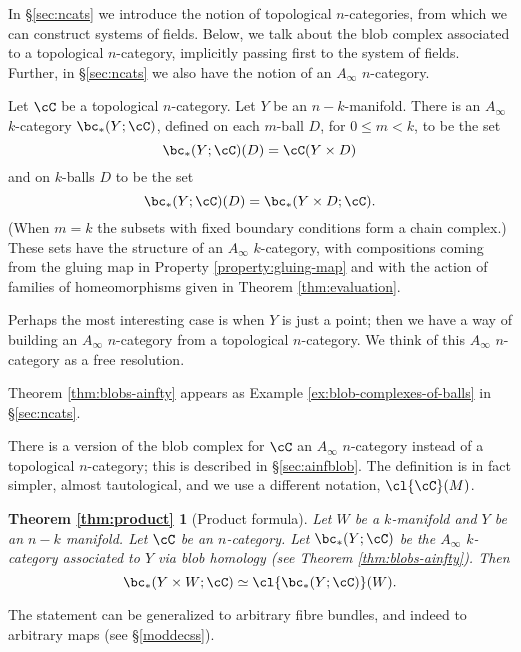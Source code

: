 

In \S \ref{sec:ncats} we introduce the notion of topological $n$-categories, from which we can construct systems of fields.
Below, we talk about the blob complex associated to a topological $n$-category, implicitly passing first to the system of fields.
Further, in \S \ref{sec:ncats} we also have the notion of an $A_\infty$ $n$-category.

\begin{thm}
\label{thm:blobs-ainfty}
Let $\cC$ be  a topological $n$-category.
Let $Y$ be an $n{-}k$-manifold. 
There is an $A_\infty$ $k$-category $\bc_*(Y;\cC)$, defined on each $m$-ball $D$, for $0 \leq m < k$, 
to be the set $$\bc_*(Y;\cC)(D) = \cC(Y \times D)$$ and on $k$-balls $D$ to be the set 
$$\bc_*(Y;\cC)(D) = \bc_*(Y \times D; \cC).$$ 
(When $m=k$ the subsets with fixed boundary conditions form a chain complex.) 
These sets have the structure of an $A_\infty$ $k$-category, with compositions coming from the gluing map in 
Property \ref{property:gluing-map} and with the action of families of homeomorphisms given in Theorem \ref{thm:evaluation}.
\end{thm}
\begin{rem}
Perhaps the most interesting case is when $Y$ is just a point; then we have a way of building an $A_\infty$ $n$-category from a topological $n$-category.
We think of this $A_\infty$ $n$-category as a free resolution.
\end{rem}

Theorem \ref{thm:blobs-ainfty} appears as Example \ref{ex:blob-complexes-of-balls} in \S \ref{sec:ncats}.

There is a version of the blob complex for $\cC$ an $A_\infty$ $n$-category
instead of a topological $n$-category; this is described in \S \ref{sec:ainfblob}.
The definition is in fact simpler, almost tautological, and we use a different notation, $\cl{\cC}(M)$. 

\newtheorem*{thm:product}{Theorem \ref{thm:product}}

\begin{thm:product}[Product formula]
Let $W$ be a $k$-manifold and $Y$ be an $n-k$ manifold.
Let $\cC$ be an $n$-category.
Let $\bc_*(Y;\cC)$ be the $A_\infty$ $k$-category associated to $Y$ via blob homology (see Theorem \ref{thm:blobs-ainfty}).
Then
\[
	\bc_*(Y\times W; \cC) \simeq \cl{\bc_*(Y;\cC)}(W).
\]
\end{thm:product}
The statement can be generalized to arbitrary fibre bundles, and indeed to arbitrary maps
(see \S \ref{moddecss}).

